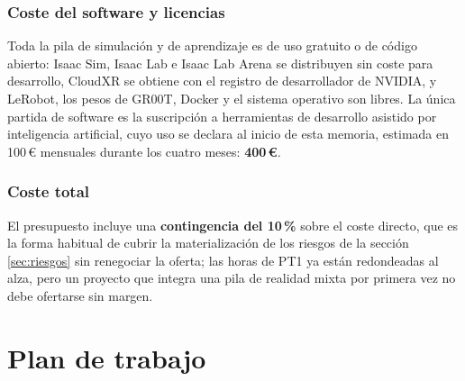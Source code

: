 \subsubsection{Coste del software y licencias}

Toda la pila de simulación y de aprendizaje es de uso gratuito o de código abierto: Isaac Sim, Isaac
Lab e Isaac Lab Arena se distribuyen sin coste para desarrollo, CloudXR se obtiene con el registro
de desarrollador de NVIDIA, y LeRobot, los pesos de GR00T, Docker y el sistema operativo son libres.
La única partida de software es la suscripción a herramientas de desarrollo asistido por
inteligencia artificial, cuyo uso se declara al inicio de esta memoria, estimada en 100\,\euro{}
mensuales durante los cuatro meses: \textbf{400\,\euro}.

\subsubsection{Coste total}

El presupuesto incluye una \textbf{contingencia del 10\,\%} sobre el coste directo, que es la forma
habitual de cubrir la materialización de los riesgos de la sección \ref{sec:riesgos} sin renegociar
la oferta; las horas de PT1 ya están redondeadas al alza, pero un proyecto que integra una pila de
realidad mixta por primera vez no debe ofertarse sin margen.

\begin{table}[ht]
	\centering
	\caption{Presupuesto total}
	\label{tab:presupuesto-total}
\end{table}


\section{Plan de trabajo}
\label{Plan de trabajo}

